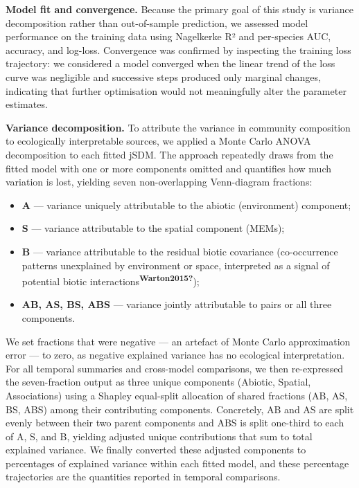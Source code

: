 \documentclass[
  12pt,
]{article}
\providecommand{\tightlist}{%
  \setlength{\itemsep}{0pt}\setlength{\parskip}{0pt}}
\begin{document}
\textbf{Model fit and convergence.} Because the primary goal of this
study is variance decomposition rather than out-of-sample prediction, we
assessed model performance on the training data using Nagelkerke R² and
per-species AUC, accuracy, and log-loss. Convergence was confirmed by
inspecting the training loss trajectory: we considered a model converged
when the linear trend of the loss curve was negligible and successive
steps produced only marginal changes, indicating that further
optimisation would not meaningfully alter the parameter estimates.

\textbf{Variance decomposition.} To attribute the variance in community
composition to ecologically interpretable sources, we applied a Monte
Carlo ANOVA decomposition to each fitted jSDM. The approach repeatedly
draws from the fitted model with one or more components omitted and
quantifies how much variation is lost, yielding seven non-overlapping
Venn-diagram fractions:

\begin{itemize}
\tightlist
\item
  \textbf{A} --- variance uniquely attributable to the abiotic
  (environment) component;
\item
  \textbf{S} --- variance attributable to the spatial component (MEMs);
\item
  \textbf{B} --- variance attributable to the residual biotic covariance
  (co-occurrence patterns unexplained by environment or space,
  interpreted as a signal of potential biotic
  interactions\textsuperscript{\textbf{Warton2015?}});
\item
  \textbf{AB, AS, BS, ABS} --- variance jointly attributable to pairs or
  all three components.
\end{itemize}

We set fractions that were negative --- an artefact of Monte Carlo
approximation error --- to zero, as negative explained variance has no
ecological interpretation. For all temporal summaries and cross-model
comparisons, we then re-expressed the seven-fraction output as three
unique components (Abiotic, Spatial, Associations) using a Shapley
equal-split allocation of shared fractions (AB, AS, BS, ABS) among their
contributing components. Concretely, AB and AS are split evenly between
their two parent components and ABS is split one-third to each of A, S,
and B, yielding adjusted unique contributions that sum to total
explained variance. We finally converted these adjusted components to
percentages of explained variance within each fitted model, and these
percentage trajectories are the quantities reported in temporal
comparisons.
\end{document}
